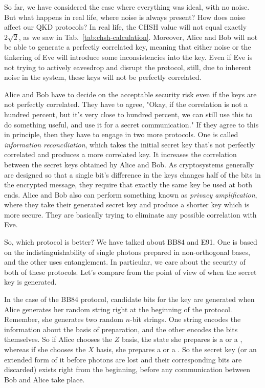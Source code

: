 So far, we have considered the case where everything was ideal, with no noise. But what happens in real life, where noise is always present? How does noise affect our QKD protocols? In real life, the CHSH value will not equal exactly $2\sqrt{2}$, as we saw in Tab.~\ref{tab:chsh-calculation}.  Moreover, Alice and Bob will not be able to generate a perfectly correlated key, meaning that either noise or the tinkering of Eve will introduce some inconsistencies into the key. Even if Eve is not trying to actively eavesdrop and disrupt the protocol, still, due to inherent noise in the system, these keys will not be perfectly correlated.

Alice and Bob have to decide on the acceptable security risk even if the keys are not perfectly correlated. They have to agree, "Okay, if the correlation is not a hundred percent, but it's very close to hundred percent, we can still use this to do something useful, and use it for a secret communication." If they agree to this in principle, then they have to engage in two more protocols. One is called  \emph{information reconciliation}, which takes the initial secret key that's not perfectly correlated and produces a more correlated key.  It increases the correlation between the secret keys obtained hy Alice and Bob.  As cryptosystems generally are designed so that a single bit's difference in the keys changes half of the bits in the encrypted message, they require that exactly the same key be used at both ends.  Alice and Bob also can perform something known as \emph{privacy amplification}, where they take their generated secret key and produce a shorter key which is more secure. They are basically trying to eliminate any possible correlation with Eve.

So, which protocol is better? We have talked about BB84 and E91. One is based on the indistinguishability of single photons prepared in non-orthogonal bases, and the other uses entanglement. In particular, we care about the security of both of these protocols. Let's compare from the point of view of when the secret key is generated.

In the case of the BB84 protocol, candidate bits for the key are generated when Alice generates her random string right at the beginning of the protocol. Remember, she generates two random $n$-bit strings. One string encodes the information about the basis of preparation, and the other encodes the bits themselves. So if Alice chooses the $Z$ basis, the state she prepares is a  or a , whereas if she chooses the $X$ basis, she prepares a \ket{+} or a \ket{-}. So the secret key (or an extended form of it before photons are lost and their corresponding bits are discarded) exists right from the beginning, before any communication between Bob and Alice take place.

